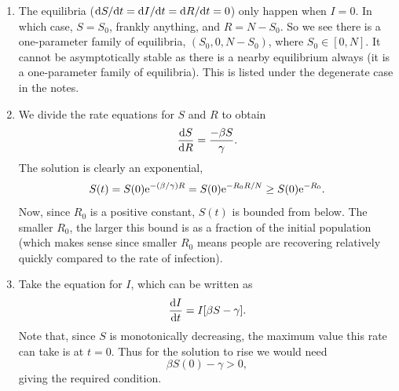 \documentclass[a4paper,12pt]{article}
\begin{document}
\begin{enumerate}[label={\bf \arabic{*}.\;}, ref={\arabic{*}},itemsep=3ex, left=0ex]
{\begin{enumerate}[label=(\alph*)]
        \item The equilibria ($\fd{S}{t} = \fd{I}{t} = \fd{R}{t} = 0$) only happen when $I=0$. In which case, $S = S_0$, frankly anything, and $R = N-S_0$. So we see there is a one-parameter family of equilibria, $(S_0,0,N-S_0)$, where  $S_0\in[0,N]$. It cannot be asymptotically stable as there is a nearby equilibrium always (it is a one-parameter family of equilibria). This is listed under the degenerate case in the notes.

        \item We divide the rate equations for $S$ and $R$ to obtain
          \begin{equation}
            \fd{S}{R} = \frac{-\beta S}{\gamma}.
          \end{equation}
          The solution is clearly an exponential,
          \begin{equation}
            S(t) = S(0)\mathrm{e} ^{-(\beta/\gamma)R} = S(0)\mathrm{e} ^{-R_0 R/N} \geq  S(0)\mathrm{e} ^{-R_0}.
          \end{equation}
          Now, since $R_0$ is a positive constant, $S(t)$ is bounded from below. The smaller $R_0$, the larger this bound is as a fraction of the initial population (which makes sense since smaller $R_0$ means people are recovering relatively quickly compared to the rate of infection).
        \item

          Take the equation for $I$, which can be written as
          \begin{equation}
            \fd{I}{t} = I[\beta S - \gamma].
          \end{equation}
          Note that, since $S$ is monotonically decreasing, the maximum value this rate can take is at $t=0$. Thus for the solution to rise we would need
          \begin{equation}
            \beta S(0) - \gamma > 0,
          \end{equation}
          giving the required condition.

      \end{enumerate}

    }


\end{enumerate}
\end{document}
